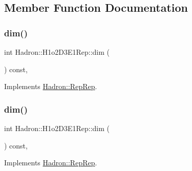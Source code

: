 \subsection{Member Function Documentation}
\mbox{\label{structHadron_1_1H1o2D3E1Rep_ae38184e966cc90c5d83145072f7f8d9d}} 
\subsubsection{\texorpdfstring{dim()}{dim()}\hspace{0.1cm}{\footnotesize\ttfamily [1/5]}}
{\footnotesize\ttfamily int Hadron\+::\+H1o2\+D3\+E1\+Rep\+::dim (\begin{DoxyParamCaption}{ }\end{DoxyParamCaption}) const\hspace{0.3cm}{\ttfamily [inline]}, {\ttfamily [virtual]}}



Implements \mbox{\hyperlink{structHadron_1_1RepRep_a92c8802e5ed7afd7da43ccfd5b7cd92b}{Hadron\+::\+Rep\+Rep}}.

\mbox{\label{structHadron_1_1H1o2D3E1Rep_ae38184e966cc90c5d83145072f7f8d9d}} 
\subsubsection{\texorpdfstring{dim()}{dim()}\hspace{0.1cm}{\footnotesize\ttfamily [2/5]}}
{\footnotesize\ttfamily int Hadron\+::\+H1o2\+D3\+E1\+Rep\+::dim (\begin{DoxyParamCaption}{ }\end{DoxyParamCaption}) const\hspace{0.3cm}{\ttfamily [inline]}, {\ttfamily [virtual]}}



Implements \mbox{\hyperlink{structHadron_1_1RepRep_a92c8802e5ed7afd7da43ccfd5b7cd92b}{Hadron\+::\+Rep\+Rep}}.

\mbox{\label{structHadron_1_1H1o2D3E1Rep_ae38184e966cc90c5d83145072f7f8d9d}} 
